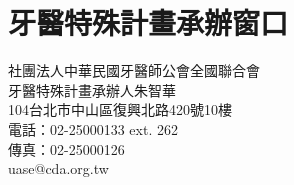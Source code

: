 \begin{longtable}{p{1.3in}p{4.8in}}

\end{longtable}


%
\section{牙醫特殊計畫承辦窗口}
\noindent 社團法人中華民國牙醫師公會全國聯合會\\
牙醫特殊計畫承辦人朱智華\\
104台北市中山區復興北路420號10樓\\
電話：02-25000133 ext. 262\\
傳真：02-25000126\\
uase@cda.org.tw\\